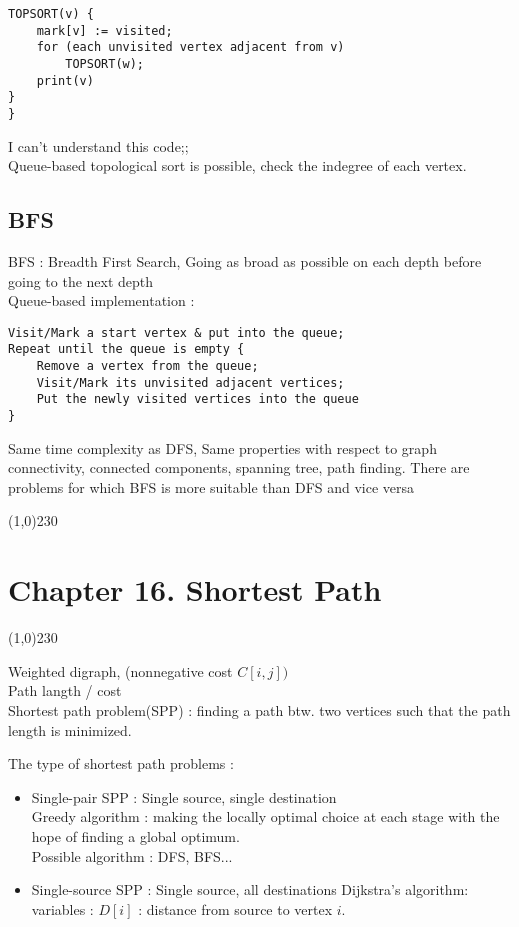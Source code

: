 \documentclass[twocolumn]{article}%
\theoremstyle{definition}
\begin{document}
\small{
\begin{verbatim}
TOPSORT(v) {
    mark[v] := visited;
    for (each unvisited vertex adjacent from v)
        TOPSORT(w);
    print(v)
}
}
\end{verbatim}
\small{I can't understand this code;;} \\
Queue-based topological sort is possible, check the indegree of each vertex.\\

\subsection*{BFS}
BFS : Breadth First Search, Going as broad as possible on each depth before going to the next depth \\
Queue-based implementation :
\small{
\begin{verbatim}
Visit/Mark a start vertex & put into the queue;
Repeat until the queue is empty {
    Remove a vertex from the queue;
    Visit/Mark its unvisited adjacent vertices;
    Put the newly visited vertices into the queue
}
\end{verbatim}
}
Same time complexity as DFS, Same properties with respect to graph connectivity, connected components, spanning tree, path finding. There are problems for which BFS is more suitable than DFS and vice versa

\newpage
\begin{center}
\line(1,0){230}
\end{center}
\section*{Chapter 16. Shortest Path}
\begin{center}
\line(1,0){230}
\end{center}

\noindent
Weighted digraph, (nonnegative cost $C[i, j])$\\
Path langth / cost \\
Shortest path problem(SPP) : finding a path btw. two vertices such that the path length is minimized.

\bigskip\noindent
The type of shortest path problems : 
\begin{itemize}
    \item Single-pair SPP : Single source, single destination \\
    Greedy algorithm : making the locally optimal choice at each stage with the hope of finding a global optimum. \\
    Possible algorithm : DFS, BFS...
    \item Single-source SPP : Single source, all destinations
    Dijkstra's algorithm: \\
    variables : $D[i]$ : distance from source to vertex $i$.\\


\end{itemize}}
\end{document}
